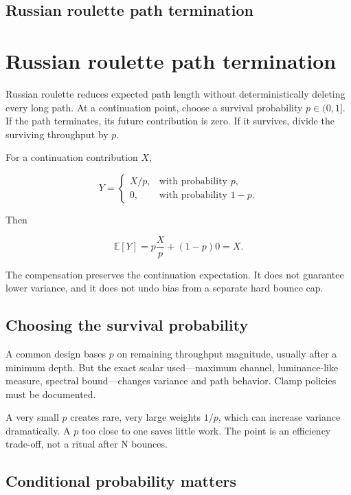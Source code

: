 \hypertarget{appendix-7277c62d4599}{}
\section*{Russian roulette path termination}
\chapter{Russian roulette path termination}\label{appendix-7277c62d4599-russian-roulette-path-termination}

Russian roulette reduces expected path length without deterministically deleting every long path. At a continuation point, choose a survival probability \(p\in(0,1]\). If the path terminates, its future contribution is zero. If it survives, divide the surviving throughput by \(p\).

For a continuation contribution \(X\),

\[
Y=
\begin{cases}
X/p,&\text{with probability }p,\\
0,&\text{with probability }1-p.
\end{cases}
\]

Then

\[
\mathbb E[Y]
=
p\frac{X}{p}+(1-p)0
=
X.
\]

The compensation preserves the continuation expectation. It does not guarantee lower variance, and it does not undo bias from a separate hard bounce cap.

\section{Choosing the survival probability}\label{appendix-7277c62d4599-choosing-the-survival-probability}

A common design bases \(p\) on remaining throughput magnitude, usually after a minimum depth. But the exact scalar used---maximum channel, luminance-like measure, spectral bound---changes variance and path behavior. Clamp policies must be documented.

A very small \(p\) creates rare, very large weights \(1/p\), which can increase variance dramatically. A \(p\) too close to one saves little work. The point is an efficiency trade-off, not a ritual after N bounces.

\section{Conditional probability matters}\label{appendix-7277c62d4599-conditional-probability-matters}

